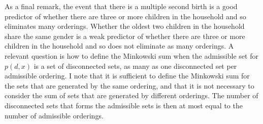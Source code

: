 \documentclass[12pt,a4paper,twoside]{article}
\numberwithin{equation}{section}
\begin{document}
As a final remark, the event that there is a multiple second birth is a good predictor of whether there are three or more children in the household and so eliminates many orderings. Whether the oldest two children in the household share the same gender is a weak predictor of whether there are three or more children in the household and so does not eliminate as many orderings. A relevant question is how to define the Minkowski sum when the admissible set for $p(d,x)$ is a set of disconnected sets, as many as one disconnected set per admissible ordering. I note that it is sufficient to define the Minkowski sum for the sets that are generated by the same ordering, and that it is not necessary to consider the sum of sets that are generated by different orderings. The number of disconnected sets that forms the admissible sets is then at most equal to the number of admissible orderings.
\end{document}
